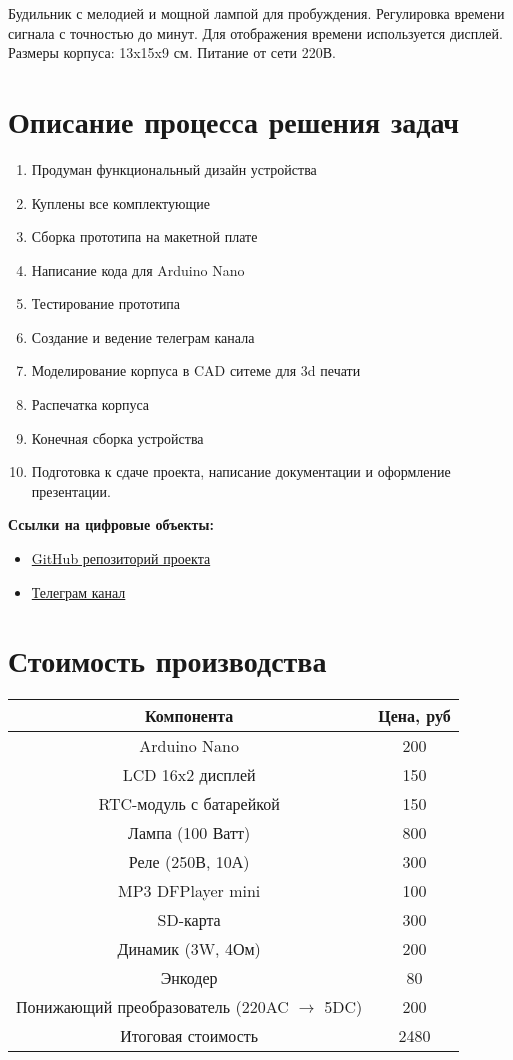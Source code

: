 \documentclass[12pt,a4paper]{article}
\begin{document}
Будильник с мелодией и мощной лампой для пробуждения. Регулировка времени сигнала с точностью до минут. Для отображения времени используется дисплей.\\
Размеры корпуса: 13x15x9 см. Питание от сети 220В.

\section{Описание процесса решения задач}

\begin{enumerate}
    \item Продуман функциональный дизайн устройства
    \item Куплены все комплектующие
    \item Сборка прототипа на макетной плате
    \item Написание кода для Arduino Nano
    \item Тестирование прототипа
    \item Создание и ведение телеграм канала
    \item Моделирование корпуса в CAD ситеме для 3d печати
    \item Распечатка корпуса
    \item Конечная сборка устройства
    \item Подготовка к сдаче проекта, написание документации и оформление презентации.
\end{enumerate}

\textbf{Ссылки на цифровые объекты:}
\begin{itemize}
    \item \href{https://github.com/nniikon/ArduinoAlarm}{GitHub репозиторий проекта}
    \item \href{https://t.me/budilnikmipt}{Телеграм канал}
\end{itemize}

\section{Стоимость производства}

\begin{tabular}{|c|c|}
    \hline
    Компонента & Цена, руб \\ \hline
    Arduino Nano & 200 \\ \hline
    LCD 16x2 дисплей & 150 \\ \hline 
    RTC-модуль с батарейкой & 150 \\ \hline
    Лампа (100 Ватт) & 800 \\ \hline
    Реле (250В, 10А) & 300 \\ \hline 
    MP3 DFPlayer mini & 100 \\ \hline 
    SD-карта & 300 \\ \hline
    Динамик (3W, 4Ом) & 200 \\ \hline 
    Энкодер & 80 \\ \hline
    Понижающий преобразователь (220AC $\rightarrow$ 5DC) & 200 \\ \hline
    Итоговая стоимость & 2480 \\ \hline
\end{tabular}
\end{document}
